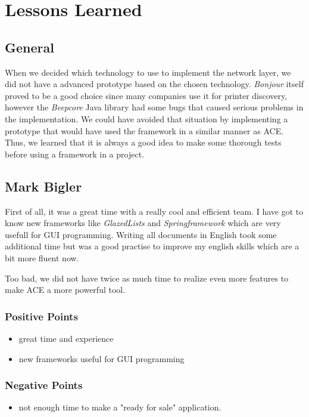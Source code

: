 \chapter{Lessons Learned}
\label{chapter:lessonslearned}



\section{General}
When we decided which technology to use to implement the network layer, we did
not have a advanced prototype based on the chosen technology. \emph{Bonjour}
itself proved to be a good choice since many companies use it for printer discovery, however the \emph{Beepcore} Java library had some bugs that caused serious problems in the implementation. We could have avoided that situation by implementing a prototype that would have used
the framework in a similar manner as ACE. Thus, we learned that it is always a good idea to make some thorough tests before using a framework in a project.



\section{Mark Bigler}
First of all, it was a great time with a really cool and efficient team. I have got to know new frameworks like \textit{GlazedLists} and \textit{Springframework} which are very usefull for GUI programming. Writing all documents in English took some additional time but was a good practise to improve my english skills which are a bit more fluent now.

Too bad, we did not have twice as much time to realize even more features to make ACE a more powerful tool.
\subsection{Positive Points}
\begin{itemize}
\item great time and experience
\item new frameworks useful for GUI programming
\end{itemize}

\subsection{Negative Points}
\begin{itemize}
\item not enough time to make a "ready for sale" application.
\end{itemize}



